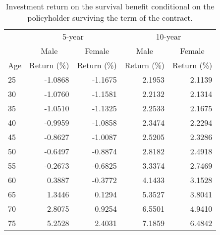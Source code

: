 \begin{table}[ht]
\centering
\begingroup\small
\begin{tabular}{|l|rr|rr|}
  \hline
& \multicolumn{2}{c|}{5-year} & \multicolumn{2}{c|}{10-year} \\
 & \multicolumn{1}{c}{Male} & \multicolumn{1}{c|}{Female} & \multicolumn{1}{c}{Male} & \multicolumn{1}{c|}{Female} \\
 \hline
Age & Return (\%) & Return (\%) & Return (\%) & Return (\%) \\ 
  \hline
25 & -1.0868 & -1.1675 & 2.1953 & 2.1139 \\ 
  30 & -1.0760 & -1.1581 & 2.2132 & 2.1314 \\ 
  35 & -1.0510 & -1.1325 & 2.2533 & 2.1675 \\ 
  40 & -0.9959 & -1.0858 & 2.3474 & 2.2294 \\ 
  45 & -0.8627 & -1.0087 & 2.5205 & 2.3286 \\ 
  50 & -0.6497 & -0.8874 & 2.8182 & 2.4918 \\ 
  55 & -0.2673 & -0.6825 & 3.3374 & 2.7469 \\ 
  60 & 0.3887 & -0.3772 & 4.1433 & 3.1528 \\ 
  65 & 1.3446 & 0.1294 & 5.3527 & 3.8041 \\ 
  70 & 2.8075 & 0.9254 & 6.5501 & 4.9410 \\ 
  75 & 5.2528 & 2.4031 & 7.1859 & 6.4842 \\ 
   \hline
\end{tabular}
\endgroup
\caption{Investment return on the survival benefit conditional on the policyholder surviving the term of the contract.} 
\label{tab:returnTable}
\end{table}

